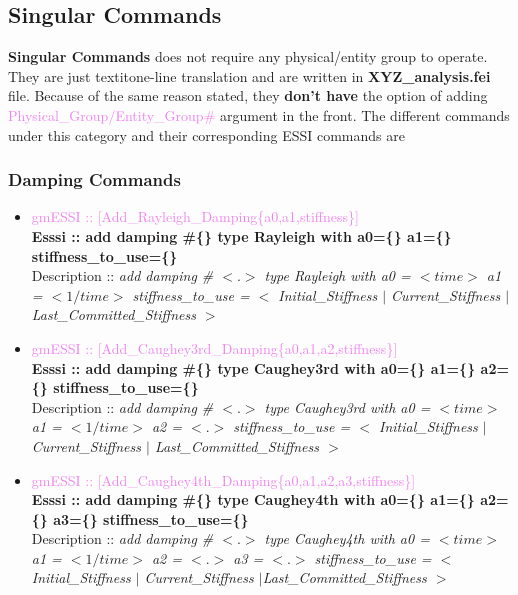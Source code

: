 \documentclass[11pt]{article}
\begin{document}
\subsection{Singular Commands}

\textbf{Singular Commands} does not require any physical/entity group to
operate. They are just textit{one-line translation} and are written in
\textbf{XYZ_analysis.fei} file. Because of the same reason stated, they
\textbf{don't have} the option of adding
\textcolor{violet}{Physical_Group/Entity_Group\#} argument in the front. The
different commands under this category and their corresponding ESSI commands
are

\subsubsection{Damping Commands}

  \begin{itemize}

    \item \textcolor{violet}{gmESSI :: [Add\_Rayleigh\_Damping\{a0,a1,stiffness\}]} \\             
    \textbf{Esssi :: add damping \#\{\} type Rayleigh with a0=\{\}  a1=\{\}  stiffness\_to\_use=\{\}}\\
    Description :: \textit{add damping \# $<.>$ type Rayleigh with a0 = $<time>$ a1 = $<1/time>$ stiffness\_to\_use = $<$ Initial\_Stiffness $|$ Current\_Stiffness $|$ Last\_Committed\_Stiffness $>$}

    \item \textcolor{violet}{gmESSI :: [Add\_Caughey3rd\_Damping\{a0,a1,a2,stiffness\}]} \\             
    \textbf{Esssi :: add damping \#\{\} type Caughey3rd with a0=\{\}  a1=\{\} a2=\{\} stiffness\_to\_use=\{\}}\\
    Description :: \textit{add damping \# $<.>$ type Caughey3rd with a0 = $<time>$ a1 = $<1/time>$ a2 = $<.>$ stiffness\_to\_use = $<$ Initial\_Stiffness $|$ Current\_Stiffness $|$ Last\_Committed\_Stiffness $>$}

    \item \textcolor{violet}{gmESSI :: [Add\_Caughey4th\_Damping\{a0,a1,a2,a3,stiffness\}]} \\             
    \textbf{Esssi :: add damping \#\{\} type Caughey4th with a0=\{\}  a1=\{\} a2=\{\} a3=\{\} stiffness\_to\_use=\{\}}\\
    Description :: \textit{add damping \# $<.>$ type Caughey4th with a0 = $<time>$ a1 = $<1/time>$ a2 = $<.>$ a3 = $<.>$ stiffness\_to\_use = $<$ Initial\_Stiffness  $|$ Current\_Stiffness $|$Last\_Committed\_Stiffness $>$}

  \end{itemize}
\end{document}
